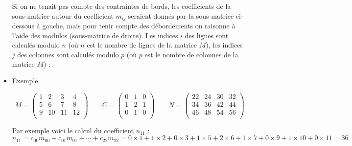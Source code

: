 \documentclass[11pt,class=report,crop=false]{standalone}
\begin{document}
\begin{cours}
\begin{itemize}

Si on ne tenait pas compte des contraintes de bords, les coefficients de la sous-matrice autour du coefficient $m_{ij}$ seraient donnés par la sous-matrice ci-dessous à gauche, mais pour tenir compte des débordements on raisonne à l'aide des modulos (sous-matrice de droite). Les indices $i$ des lignes sont calculés modulo $n$ (où $n$ est le nombre de lignes de la matrice $M$), les indices $j$ des colonnes sont calculés modulo $p$ (où $p$ est le nombre de colonnes de la matrice $M$)  :


\item Exemple.

$$M = \begin{pmatrix}
1&2&3&4\\5&6&7&8\\9&10&11&12\\
\end{pmatrix}\qquad
C = \begin{pmatrix}
0&1&0\\1&2&1\\0&1&0\\
\end{pmatrix}\qquad
N = \begin{pmatrix}
22 & 24 & 30 & 32 \\ 
34 & 36 & 42 & 44 \\ 
46 & 48 & 54 & 56 \\
\end{pmatrix}$$

\smallskip

Par exemple voici le calcul du coefficient $n_{11}$ :
$$n_{11} = c_{00}m_{00} + c_{01}m_{01} + \cdots + c_{22}m_{22}
= 0\times 1 + 1\times 2 + 0 \times 3 
+ 1\times 5 + 2\times 6 + 1 \times 7   
+ 0\times 9 + 1\times 10 + 0 \times 11 = 36
$$

\end{itemize}
\end{cours}

\end{document}
